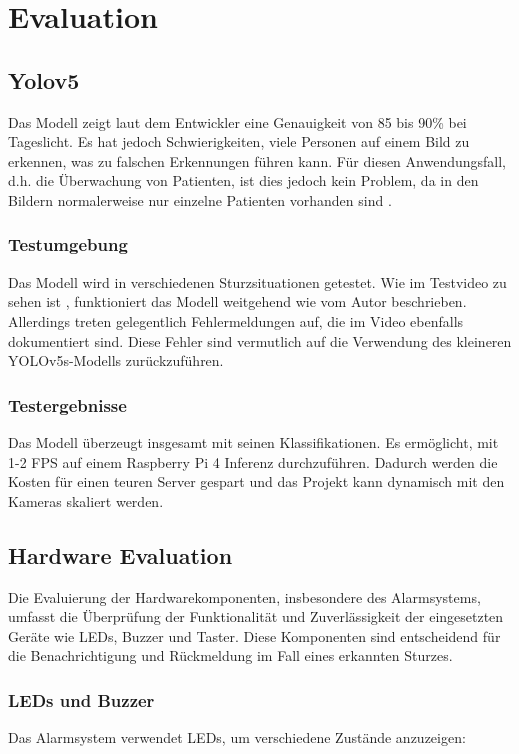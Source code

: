 \section{Evaluation}

\subsection{Yolov5}
Das Modell zeigt laut dem Entwickler eine Genauigkeit von 85 bis 90\% bei Tageslicht. Es hat jedoch Schwierigkeiten, viele Personen auf einem Bild zu erkennen, was zu falschen Erkennungen führen kann. Für diesen Anwendungsfall, d.h. die Überwachung von Patienten, ist dies jedoch kein Problem, da in den Bildern normalerweise nur einzelne Patienten vorhanden sind \cite{kumar_uttej2001image-based-human-fall-detection_2024}. 

\subsubsection{Testumgebung}
Das Modell wird in verschiedenen Sturzsituationen getestet. Wie im Testvideo zu sehen ist \cite{yolovideo}, funktioniert das Modell weitgehend wie vom Autor beschrieben. Allerdings treten gelegentlich Fehlermeldungen auf, die im Video ebenfalls dokumentiert sind. Diese Fehler sind vermutlich auf die Verwendung des kleineren YOLOv5s-Modells zurückzuführen.

\subsubsection{Testergebnisse}
Das Modell überzeugt insgesamt mit seinen Klassifikationen. Es ermöglicht, mit 1-2 FPS auf einem Raspberry Pi 4 Inferenz durchzuführen. Dadurch werden die Kosten für einen teuren Server gespart und das Projekt kann dynamisch mit den Kameras skaliert werden.

\subsection{Hardware Evaluation}

Die Evaluierung der Hardwarekomponenten, insbesondere des Alarmsystems, umfasst die Überprüfung der Funktionalität und Zuverlässigkeit der eingesetzten Geräte wie LEDs, Buzzer und Taster. Diese Komponenten sind entscheidend für die Benachrichtigung und Rückmeldung im Fall eines erkannten Sturzes.

\subsubsection{LEDs und Buzzer}
Das Alarmsystem verwendet LEDs, um verschiedene Zustände anzuzeigen:

